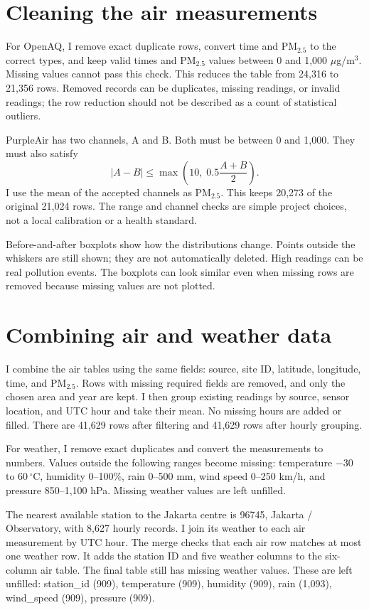 \documentclass[11pt,a4paper]{article}
\begin{document}
\section{Cleaning the air measurements}
For OpenAQ, I remove exact duplicate rows, convert time and PM$_{2.5}$ to the correct types, and keep valid times and PM$_{2.5}$ values between 0 and 1,000 $\mu$g/m$^3$. Missing values cannot pass this check. This reduces the table from 24,316 to 21,356 rows. Removed records can be duplicates, missing readings, or invalid readings; the row reduction should not be described as a count of statistical outliers.

PurpleAir has two channels, A and B. Both must be between 0 and 1,000. They must also satisfy
\[
|A-B|\leq\max\left(10,\;0.5\frac{A+B}{2}\right).
\]
I use the mean of the accepted channels as PM$_{2.5}$. This keeps 20,273 of the original 21,024 rows. The range and channel checks are simple project choices, not a local calibration or a health standard.

Before-and-after boxplots show how the distributions change. Points outside the whiskers are still shown; they are not automatically deleted. High readings can be real pollution events. The boxplots can look similar even when missing rows are removed because missing values are not plotted.
\section{Combining air and weather data}
I combine the air tables using the same fields: source, site ID, latitude, longitude, time, and PM$_{2.5}$. Rows with missing required fields are removed, and only the chosen area and year are kept. I then group existing readings by source, sensor location, and UTC hour and take their mean. No missing hours are added or filled. There are 41,629 rows after filtering and 41,629 rows after hourly grouping.

For weather, I remove exact duplicates and convert the measurements to numbers. Values outside the following ranges become missing: temperature $-30$ to $60\,^{\circ}$C, humidity 0--100\%, rain 0--500 mm, wind speed 0--250 km/h, and pressure 850--1,100 hPa. Missing weather values are left unfilled.

The nearest available station to the Jakarta centre is 96745, Jakarta / Observatory, with 8,627 hourly records. I join its weather to each air measurement by UTC hour. The merge checks that each air row matches at most one weather row. It adds the station ID and five weather columns to the six-column air table. The final table still has missing weather values. These are left unfilled: station\_id (909), temperature (909), humidity (909), rain (1,093), wind\_speed (909), pressure (909).
\end{document}
